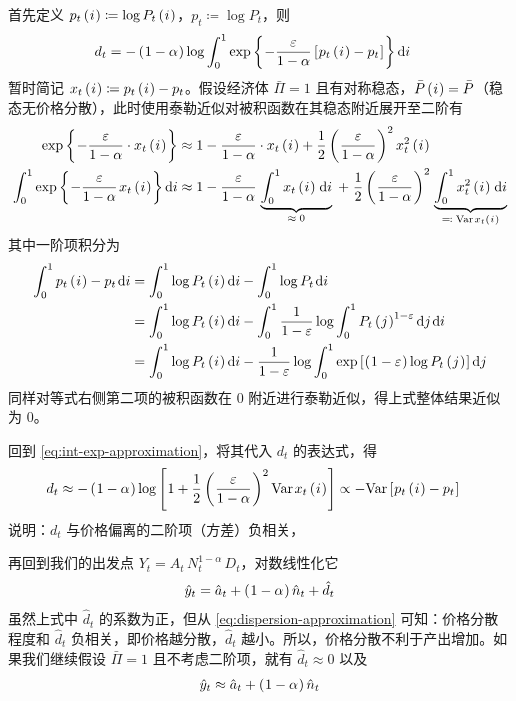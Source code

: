 首先定义 \(p_t\left(\mspace{1mu} i\mspace{1mu}\right)\coloneq\operatorname{log} P_t\left(\mspace{1mu} i\mspace{1mu}\right)\)，\(p_t\coloneq\log P_t\)，则
\begin{align*}
    d_t&=-\left(\mspace{1mu}1-\alpha\mspace{1mu}\right)\operatorname{log}\int^1_0 \exp\left\{\mspace{1mu}-\frac\varepsilon{1-\alpha}\left[\mspace{1mu} p_t\left(\mspace{1mu} i\mspace{1mu}\right)-p_t\mspace{1mu}\right]\mspace{1mu}\right\}\mathrm di
\end{align*}
暂时简记 \(x_t\left(\mspace{1mu} i\mspace{1mu}\right)\coloneq p_t\left(\mspace{1mu} i\mspace{1mu}\right)-p_t\)。假设经济体 \(\bar \Pi=1\) 且有对称稳态，\(\bar P\left(\mspace{1mu} i\mspace{1mu}\right)=\bar P\)（稳态无价格分散），此时使用泰勒近似对被积函数在其稳态附近展开至二阶有
\begin{align}
    \exp\bkd{-\frac\varepsilon{1-\alpha}\cdot x_t\bki}&\approx 1-\dfrac\varepsilon{1-\alpha}\cdot x_t\bki+\dfrac12\bka{\dfrac\varepsilon{1-\alpha}}^2x_t^2\bki\notag\\
    \int^1_0 \exp\bkd{-\frac\varepsilon{1-\alpha}\,x_t\bki}\mathrm di&\approx 1-\dfrac\varepsilon{1-\alpha}\,\underbrace{\int^1_0 x_t\bki\,\mathrm di}_{\approx\;0}\;+\;\dfrac12\bka{\dfrac\varepsilon{1-\alpha}}^2 \,\underbrace{\int^1_0 x_t^2\bki\,\mathrm di}_{\eqcolon\;\var\, x_t\bki}\label{eq:int-exp-approximation}
\end{align}
其中一阶项积分为
\begin{align*}
    \int^1_0p_t\bki-p_t\,\mathrm di&=\int^1_0\log P_t\bki\mathrm di-\int^1_0\log P_t\,\mathrm di\\
    &=\int^1_0\log P_t\bki\mathrm di-\int^1_0\frac1{1-\varepsilon}\log{\int^1_0P_t\bkj^{1-\varepsilon}\mathrm dj}\,\mathrm di\\
    &=\int^1_0\log P_t\bki\mathrm di-\frac1{1-\varepsilon}\log{\int^1_0\exp\bks{\bka{1-\varepsilon}\log P_t\bkj}\mathrm dj}
\end{align*}
同样对等式右侧第二项的被积函数在 \(0\) 附近进行泰勒近似，得上式整体结果近似为 0。

回到 \ref{eq:int-exp-approximation}，将其代入 \(d_t\) 的表达式，得
\begin{align}
    d_t&\approx -\bka{1-\alpha}\log\bks{1+\dfrac12\bka{\dfrac\varepsilon{1-\alpha}}^2\var\, x_t\bki}\propto-\var\bks{p_t\bki-p_t}\label{eq:dispersion-approximation}
\end{align}
说明：\(d_t\) 与价格偏离的二阶项（方差）负相关，

再回到我们的出发点 \(Y_t=A_t\,N_t^{1-\alpha}\,D_t\)，对数线性化它
\begin{align*}
    \hat y_t=\hat a_t+\left(\mspace{1mu}1-\alpha\mspace{1mu}\right)\hat n_t+\hat d_t
\end{align*}
虽然上式中 \(\hat d_t\) 的系数为正，但从 \ref{eq:dispersion-approximation} 可知：价格分散程度和 \(\hat d_t\) 负相关，即价格越分散，\(\hat d_t\) 越小。所以，价格分散不利于产出增加。如果我们继续假设 \(\bar\Pi=1\) 且不考虑二阶项，就有 \(\hat d_t\approx0\) 以及
\begin{align}
    \hat y_t\approx\hat a_t+\left(\mspace{1mu}1-\alpha\mspace{1mu}\right)\hat n_t\label{eq:output-approximation}
\end{align}


